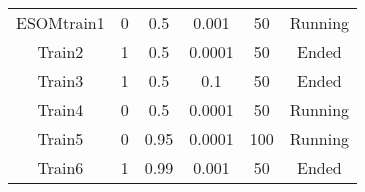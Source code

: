 \documentclass[11pt,fleqn]{book} %
\begin{document}
\begin{table}[h!]
\begin{tabular}{ c c c c c c }
																																																																																																																																																																																																																																																																																						          ESOMtrain1 & 0 & 0.5 & 0.001 & 50 & Running\\
																																																																																																																																																																																																																																																																																							      Train2 & 1 & 0.5 & 0.0001 & 50 & Ended\\
																																																																																																																																																																																																																																																																																							          Train3 & 1 & 0.5 & 0.1 & 50 & Ended\\
																																																																																																																																																																																																																																																																																								      Train4 & 0 & 0.5 & 0.0001 & 50 & Running\\
																																																																																																																																																																																																																																																																																								          Train5 & 0 & 0.95 & 0.0001 & 100 & Running\\
																																																																																																																																																																																																																																																																																									      Train6 & 1 & 0.99 & 0.001 & 50 & Ended\\


\end{tabular}
\end{table}
\end{document}
